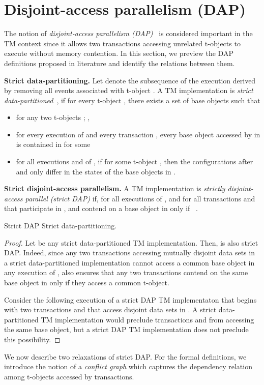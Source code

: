 \section{Disjoint-access parallelism (DAP)}
\label{sec:dap}
The notion of \emph{disjoint-access parallelism (DAP)}~\cite{israeli-disjoint}
is considered important in the TM context since it allows two transactions accessing unrelated t-objects to execute
without memory contention.
In this section, we preview the DAP definitions proposed in literature and identify the relations between them.

\vspace{1mm}\noindent\textbf{Strict data-partitioning.}
Let  denote the subsequence of the execution  derived by removing all events associated with t-object .
A TM implementation  is \emph{strict data-partitioned}~\cite{tm-book}, if for every t-object , 
there exists a set of base objects  such that
\begin{itemize}
\item
for any two t-objects ; ,
\item 
for every execution  of  and every transaction ,
every base object accessed by  in  is contained in  for some 
\item
for all executions  and  of , if  for some t-object , then the configurations after  and
 only differ in the states of the base objects in .
\end{itemize}
\vspace{1mm}\noindent\textbf{Strict disjoint-access parallelism.}
A TM implementation  is \emph{strictly disjoint-access parallel
  (strict DAP)} if, for
all executions  of , and for all transactions  and  that participate in , 
 and  contend on a base object in  only if 
~\cite{tm-book}.
\begin{proposition}
Strict DAP  Strict data-partitioning.
\end{proposition}
\begin{proof}
Let  be any strict data-partitioned TM implementation. Then,  is also strict DAP. Indeed,
since any two transactions accessing mutually disjoint data sets in a strict data-partitioned implementation
cannot access a common base object in any execution  of ,  also ensures that
any two transactions
contend on the same base object in  only if   
they access a common t-object.

Consider the following execution  of a strict DAP TM implementaton  
that begins with two transactions  and  that access disjoint data sets in . 
A strict data-partitioned TM implementation
would preclude transactions  and  from accessing the same base object, but a strict DAP
TM implementation does not preclude this possibility.
\end{proof}
We now describe two relaxations of strict DAP. For the formal definitions, we introduce the notion of a
\emph{conflict graph} which captures the dependency relation among t-objects accessed by transactions.

